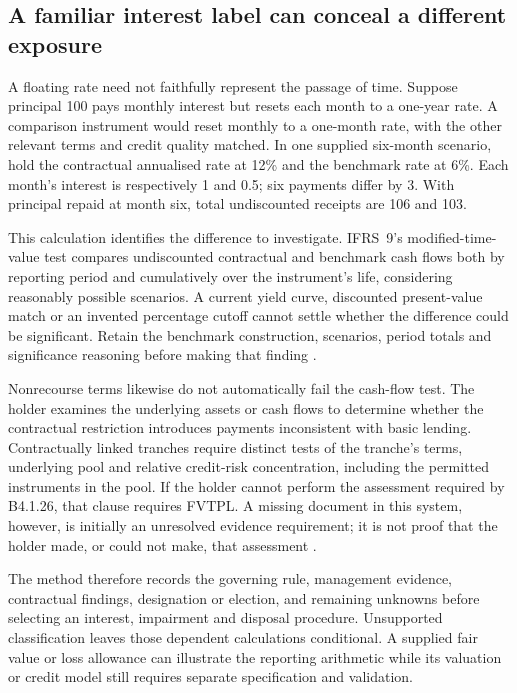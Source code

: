 \subsection{A familiar interest label can conceal a different exposure}

A floating rate need not faithfully represent the passage of time. Suppose
principal 100 pays monthly interest but resets each month to a one-year
rate. A comparison instrument would reset monthly to a one-month rate,
with the other relevant terms and credit quality matched. In one supplied
six-month scenario, hold the contractual annualised rate at 12\% and the
benchmark rate at 6\%. Each month's interest is respectively 1 and 0.5;
six payments differ by 3. With principal repaid at month six, total
undiscounted receipts are 106 and 103.

This calculation identifies the difference to investigate. IFRS~9's
modified-time-value test compares undiscounted contractual and benchmark
cash flows both by reporting period and cumulatively over the instrument's
life, considering reasonably possible scenarios. A current yield curve,
discounted present-value match or an invented percentage cutoff cannot
settle whether the difference could be significant. Retain the benchmark
construction, scenarios, period totals and significance reasoning before
making that finding \citep[IFRS~9.B4.1.9A--9E]{eu20231803}.

Nonrecourse terms likewise do not automatically fail the cash-flow test.
The holder examines the underlying assets or cash flows to determine whether
the contractual restriction introduces payments inconsistent with basic
lending. Contractually linked tranches require distinct tests of the
tranche's terms, underlying pool and relative credit-risk concentration,
including the permitted instruments in the pool. If the holder cannot
perform the assessment required by B4.1.26, that clause requires FVTPL.
A missing document in this system, however, is initially an unresolved
evidence requirement; it is not proof that the holder made, or could not
make, that assessment \citep[IFRS~9.B4.1.15--26]{eu20231803}.

The method therefore records the governing rule, management evidence,
contractual findings, designation or election, and remaining unknowns before
selecting an interest, impairment and disposal procedure. Unsupported
classification leaves those dependent calculations conditional. A supplied
fair value or loss allowance can illustrate the reporting arithmetic while
its valuation or credit model still requires separate specification and
validation.

